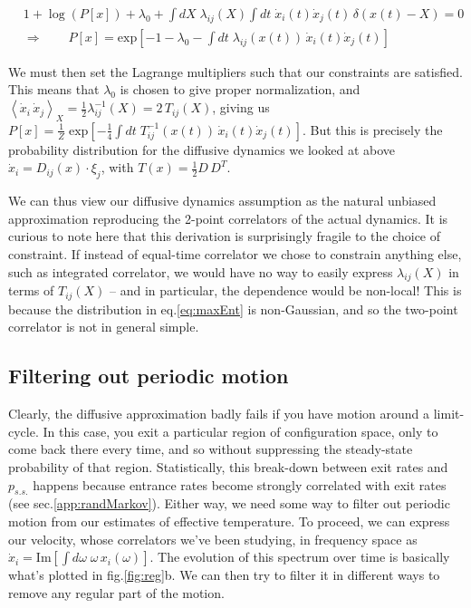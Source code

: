 \documentclass[reprint,prx]{revtex4-1}
\renewcommand{\=}[1]{\stackrel{#1}{=}} %
\renewcommand{\(}{\left (}
\renewcommand{\)}{\right  )}
\renewcommand{\[}{\left [}
\renewcommand{\]}{\right ]}
\newcommand{\<}{\left <}
\renewcommand{\>}{\right >}
\theoremstyle{definition}
\theoremstyle{remark}
\renewcommand{\exp}[1]{\mbox{exp}\[#1\]} %
\renewcommand{\Im}{\mbox{Im}}  %
\begin{document}
\begin{widetext}
	\begin{align}
	&1+ \log(P[x])+\lambda_0 + \int dX \; \lambda_{ij}(X) \int dt \; \dot{x}_i(t) \dot{x}_j(t) \,\delta(x(t) - X) =0\\
	&\Rightarrow \qquad P[x]=\exp{-1-\lambda_{0}-\int dt \; \lambda_{ij}(x(t))\,\dot{x}_i(t) \dot{x}_j(t) } \label{eq:maxEnt}
	\end{align} 
\end{widetext}
We must then set the Lagrange multipliers such that our constraints are satisfied. This means that $ \lambda_0 $ is chosen to give proper normalization, and $ \< \dot{x}_i\, \dot{x}_j\>_X = \frac{1}{2}\lambda^{-1}_{ij}(X) = 2 \,T_{ij}(X)$, giving us $ P[x]=\frac{1}{Z}\; \exp{-\frac{1}{4}\int dt \; T^{-1}_{ij}(x(t)) \,\dot{x}_i(t) \dot{x}_j(t)}  $. But this is precisely the probability distribution for the diffusive dynamics we looked at above $ \dot{x}_i = D_{ij}(x)\cdot \xi_j $, with $ T(x) = \frac{1}{2} D\, D^T $. 

We can thus view our diffusive dynamics assumption as the natural unbiased approximation reproducing the 2-point correlators of the actual dynamics. It is curious to note here that this derivation is surprisingly fragile to the choice of constraint. If instead of equal-time correlator we chose to constrain anything else, such as integrated correlator, we would have no way to easily express $ \lambda_{ij}(X) $ in terms of $ T_{ij}(X) $ -- and in particular, the dependence would be non-local! This is because the distribution in eq.\ref{eq:maxEnt} is non-Gaussian, and so the two-point correlator is not in general simple. 

\subsection{Filtering out periodic motion}
Clearly, the diffusive approximation badly fails if you have motion around a limit-cycle. In this case, you exit a particular region of configuration space, only to come back there every time, and so without suppressing the steady-state probability of that region. Statistically, this break-down between exit rates and $ p_{s.s.} $ happens because entrance rates become strongly correlated with exit rates (see sec.\ref{app:randMarkov}). Either way, we need some way to filter out periodic motion from our estimates of effective temperature. To proceed, we can express our velocity, whose correlators we've been studying, in frequency space as $ \dot{x}_i = \Im\[\int d\omega \; \omega\, x_i(\omega)\] $. The evolution of this spectrum over time is basically what's plotted in fig.\ref{fig:reg}b. We can then try to filter it in different ways to remove any regular part of the motion. 
\end{document}
